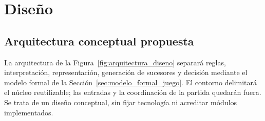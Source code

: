 \chapter{Diseño}

\section{Arquitectura conceptual propuesta}
\label{sec:arquitectura_propuesta}

La arquitectura de la Figura~\ref{fig:arquitectura_diseno} separará reglas, interpretación, representación, generación de sucesores y decisión mediante el modelo formal de la Sección~\ref{sec:modelo_formal_juego}. El contorno delimitará el núcleo reutilizable; las entradas y la coordinación de la partida quedarán fuera. Se trata de un diseño conceptual, sin fijar tecnología ni acreditar módulos implementados.

